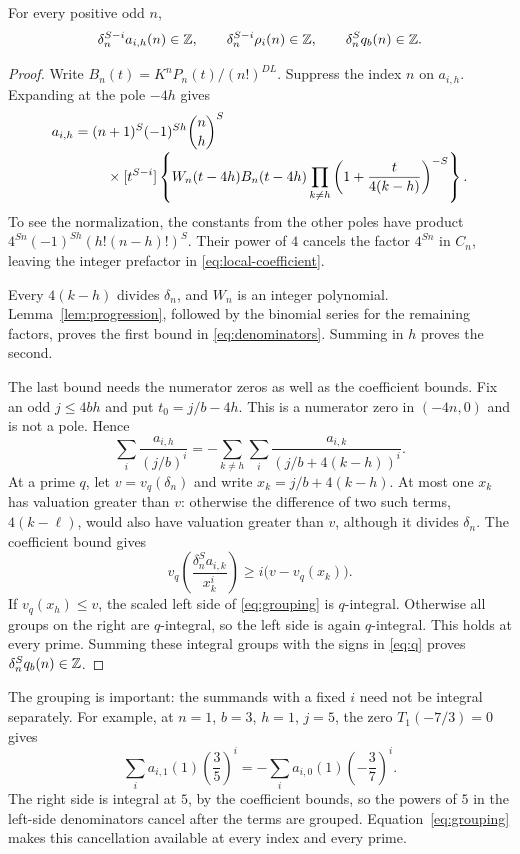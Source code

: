 \begin{proposition}\label{prop:denominators}
For every positive odd $n$,
\begin{equation}\label{eq:denominators}
 \delta_n^{S-i}a_{i,h}(n)\in\mathbb Z,\qquad
 \delta_n^{S-i}\rho_i(n)\in\mathbb Z,\qquad
 \delta_n^S q_b(n)\in\mathbb Z.
\end{equation}
\end{proposition}
\begin{proof}
Write $B_n(t)=K^nP_n(t)/(n!)^{DL}$. Suppress the index $n$ on
$a_{i,h}$. Expanding at the pole $-4h$ gives
\begin{align}
 a_{i,h}={}&(n+1)^S(-1)^{Sh}\binom nh^S\notag\\[-2pt]
 &\quad\times[t^{S-i}]
 \left\{W_n(t-4h)B_n(t-4h)
       \prod_{k\ne h}\left(1+\frac{t}{4(k-h)}\right)^{-S}\right\}.
 \label{eq:local-coefficient}
\end{align}
To see the normalization, the constants from the other poles have
product $4^{Sn}(-1)^{Sh}(h!(n-h)!)^S$. Their power of $4$ cancels
the factor $4^{Sn}$ in $C_n$, leaving the integer prefactor in
\eqref{eq:local-coefficient}.

Every $4(k-h)$ divides $\delta_n$, and $W_n$ is an integer
polynomial. Lemma~\ref{lem:progression}, followed by the binomial
series for the remaining factors, proves the first bound in
\eqref{eq:denominators}. Summing in $h$ proves the second.

The last bound needs the numerator zeros as well as the coefficient
bounds. Fix an odd $j\le4bh$ and put $t_0=j/b-4h$. This is a
numerator zero in $(-4n,0)$ and is not a pole. Hence
\begin{equation}\label{eq:grouping}
 \sum_i\frac{a_{i,h}}{(j/b)^i}
   =-\sum_{k\ne h}\sum_i
                 \frac{a_{i,k}}{(j/b+4(k-h))^i}.
\end{equation}
At a prime $q$, let $v=v_q(\delta_n)$ and write
$x_k=j/b+4(k-h)$. At most one $x_k$ has valuation greater than
$v$: otherwise the difference of two such terms,
$4(k-\ell)$, would also have valuation greater than $v$, although
it divides $\delta_n$. The coefficient bound gives
\begin{equation}\label{eq:group-valuation}
 v_q\!\left(\frac{\delta_n^S a_{i,k}}{x_k^i}\right)
          \ge i\bigl(v-v_q(x_k)\bigr).
\end{equation}
If $v_q(x_h)\le v$, the scaled left side of \eqref{eq:grouping}
is $q$-integral. Otherwise all groups on the right are $q$-integral,
so the left side is again $q$-integral. This holds at every prime.
Summing these integral groups with the signs in \eqref{eq:q}
proves $\delta_n^S q_b(n)\in\mathbb Z$.
\end{proof}

The grouping is important: the summands with a fixed $i$ need not
be integral separately. For example, at $n=1$, $b=3$, $h=1$,
$j=5$, the zero $T_1(-7/3)=0$ gives
\[
 \sum_i a_{i,1}(1)\left(\frac35\right)^i
   =-\sum_i a_{i,0}(1)\left(-\frac37\right)^i.
\]
The right side is integral at $5$, by the coefficient bounds, so
the powers of $5$ in the left-side denominators cancel after the
terms are grouped. Equation~\eqref{eq:grouping} makes this
cancellation available at every index and every prime.

